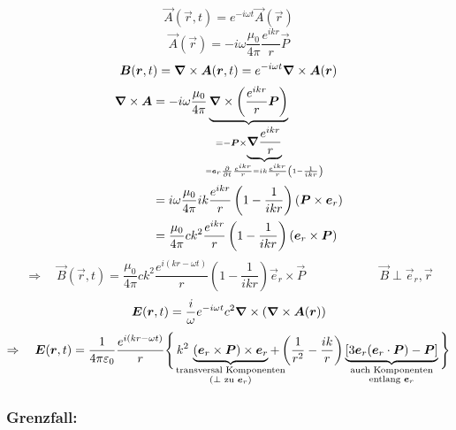 \begin{equation*}
\vec{A}(\vec{r},t) = e^{- i \omega t} \vec{A}(\vec{r})
\end{equation*}
\begin{equation*}
\vec{A}(\vec{r}) = - i \omega \frac{\mu_0}{4 \pi} \frac{e^{i k r}}{r} \vec{P}
\end{equation*}
\begin{equation*}
\bm{B}(\bm{r},t) = \bm{\nabla} \times \bm{A}(\bm{r},t) = e^{- i \omega t} \bm{\nabla} \times \bm{A}(\bm{r})
\end{equation*}
\begin{align*}
\vabla \times \vec{A} &= - i \omega \frac{\mu_0}{4 \pi} \ub{\vabla \times \left(\frac{e^{ikr}}{r} \vec{P}\right)}_{ = - \vec{P} \times \ub{\vabla \frac{e^{ikr}}{r}}_{\mathclap{= \vec{e}_{r} \prt{}{t} \frac{e^{ikr}}{r} = i k \frac{e^{ikr}}{r} \left(1 - \frac{1}{ikr}\right)}}}\\
&= i \omega \frac{\mu_0}{4 \pi} i k \frac{e^{ikr}}{r} \left(1 - \frac{1}{ikr}\right) (\vec{P} \times \vec{e}_{r})\\
&= \frac{\mu_0}{4 \pi} ck^2 \frac{e^{ikr}}{r} \left(1 - \frac{1}{ikr}\right) (\vec{e}_{r} \times \vec{P})
\end{align*}
\begin{equation*}
\Rightarrow \quad \vec{B}(\vec{r},t) = \frac{\mu_0}{4 \pi} ck^2 \frac{e^{i(kr - \omega t)}}{r} \left(1 - \frac{1}{ikr}\right) \vec{e}_r \times \vec{P} \qquad \qquad \qquad \vec{B} \perp \vec{e}_r , \vec{r}
\end{equation*}
%
%
%
%
%
%
\begin{equation*}
\bm{E}(\bm{r},t) = \frac{i}{\omega} e^{- i \omega t} c^2 \bm{\nabla} \times (\bm{\nabla} \times \bm{A}(\bm{r}))
\end{equation*}
\begin{equation*}
\Rightarrow \quad \vec{E}(\vec{r},t) = \kq \frac{e^{i (kr - \omega t)}}{r} \Bigg\{ \, k^2 \, \ub{(\vec{e}_r \times \vec{P}) \times \vec{e}_r}_{\mathclap{\substack{\tx{transversal Komponenten} \\ (\perp \tx{ zu } \vec{e}_r)}}} + \left(\frac{1}{r^2} - \frac{ik}{r}\right) \ub{\left[3 \vec{e}_r (\vec{e}_r \cdot \vec{P}) - \vec{P}\right]}_{\mathclap{\substack{\tx{auch Komponenten} \\ \tx{entlang } \vec{e}_r}}} \Bigg\}
\end{equation*}

\subsubsection{Grenzfall:}


